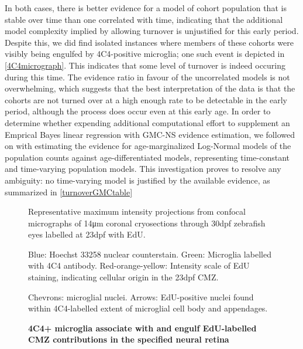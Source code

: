 In both cases, there is better evidence for a model of cohort population that is stable over time than one correlated with time, indicating that the additional model complexity implied by allowing turnover is unjustified for this early period. Despite this, we did find isolated instances where members of these cohorts were visibly being engulfed by 4C4-positive microglia; one such event is depicted in \autoref{4C4micrograph}. This indicates that some level of turnover is indeed occuring during this time. The evidence ratio in favour of the uncorrelated models is not overwhelming, which suggests that the best interpretation of the data is that the cohorts are not turned over at a high enough rate to be detectable in the early period, although the process does occur even at this early age. In order to determine whether expending additional computational effort to supplement an Emprical Bayes linear regression with GMC-NS evidence estimation, we followed on with estimating the evidence for age-marginalized Log-Normal models of the population counts against age-differentiated models, representing time-constant and time-varying population models. This investigation proves to resolve any ambiguity: no time-varying model is justified by the available evidence, as summarized in \autoref{turnoverGMCtable}

\begin{figure}[!h]
    \caption{{\bf 4C4+ microglia associate with and engulf EdU-labelled CMZ contributions in the specified neural retina}}
    Representative maximum intensity projections from confocal micrographs of 14\si{\micro\metre} coronal cryosections through 30dpf zebrafish eyes labelled at 23dpf with EdU.
    
    Blue: Hoechst 33258 nuclear counterstain. Green: Microglia labelled with 4C4 antibody. Red-orange-yellow: Intensity scale of EdU staining, indicating cellular origin in the 23dpf CMZ.

    Chevrons: microglial nuclei. Arrows: EdU-positive nuclei found within 4C4-labelled extent of microglial cell body and appendages.
    \label{4C4micrograph}
\end{figure}


